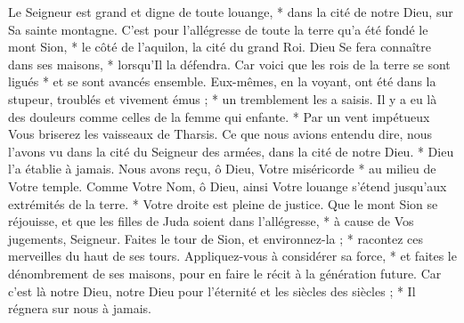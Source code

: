 Le Seigneur est grand et digne de toute louange, * dans la cité de notre Dieu, sur Sa sainte montagne.
\versseparator
 C'est pour l'allégresse de toute la terre qu'a été fondé le mont Sion, * le côté de l'aquilon, la cité du grand Roi.
\versseparator
 Dieu Se fera connaître dans ses maisons, * lorsqu'Il la défendra.
\versseparator
 Car voici que les rois de la terre se sont ligués * et se sont avancés ensemble.
\versseparator
 Eux-mêmes, en la voyant, ont été dans la stupeur, troublés et vivement émus ; * un tremblement les a saisis.
\versseparator
 Il y a eu là des douleurs comme celles de la femme qui enfante. * Par un vent impétueux Vous briserez les vaisseaux de Tharsis.
\versseparator
 Ce que nous avions entendu dire, nous l'avons vu dans la cité du Seigneur des armées, dans la cité de notre Dieu. * Dieu l'a établie à jamais.
\versseparator
 Nous avons reçu, ô Dieu, Votre miséricorde * au milieu de Votre temple.
\versseparator
 Comme Votre Nom, ô Dieu, ainsi Votre louange s'étend jusqu'aux extrémités de la terre. * Votre droite est pleine de justice.
\versseparator
 Que le mont Sion se réjouisse, et que les filles de Juda soient dans l'allégresse, * à cause de Vos jugements, Seigneur.
\versseparator
 Faites le tour de Sion, et environnez-la ; * racontez ces merveilles du haut de ses tours.
\versseparator
 Appliquez-vous à considérer sa force, * et faites le dénombrement de ses maisons, pour en faire le récit à la génération future.
\versseparator
 Car c'est là notre Dieu, notre Dieu pour l'éternité et les siècles des siècles ; * Il régnera sur nous à jamais.